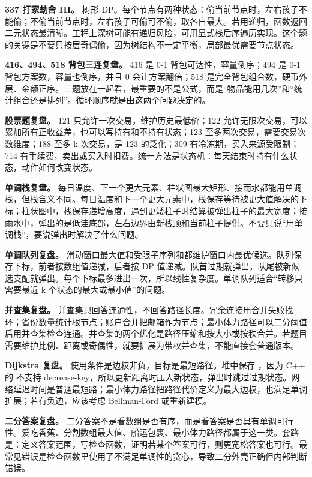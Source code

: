 \textbf{337 打家劫舍 III。} 树形 DP。每个节点有两种状态：偷当前节点时，左右孩子不能偷；不偷当前节点时，左右孩子可偷可不偷，取各自最大。若用递归，函数返回二元状态最清晰。工程上深树可能有递归风险，可用显式栈后序遍历实现。这个题的关键是不要只按层奇偶偷，因为树结构不一定平衡，局部最优需要节点状态。

\textbf{416、494、518 背包三连复盘。} 416 是 0-1 背包可达性，容量倒序；494 是 0-1 背包方案数，容量也倒序，并且 0 会让方案翻倍；518 是完全背包组合数，硬币外层、金额正序。三题放在一起看，最重要的不是公式，而是“物品能用几次”和“统计组合还是排列”。循环顺序就是由这两个问题决定的。

\textbf{股票题复盘。} 121 只允许一次交易，维护历史最低价；122 允许无限次交易，可以累加所有正收益差，也可以写持有和不持有状态；123 至多两次交易，需要交易次数维度；188 至多 k 次交易，是 123 的泛化；309 有冷冻期，买入来源受限制；714 有手续费，卖出或买入时扣费。统一方法是状态机：每天结束时持有什么状态，动作如何改变状态。

\textbf{单调栈复盘。} 每日温度、下一个更大元素、柱状图最大矩形、接雨水都能用单调栈，但栈含义不同。每日温度和下一个更大元素中，栈保存等待被更大值解决的下标；柱状图中，栈保存递增高度，遇到更矮柱子时结算被弹出柱子的最大宽度；接雨水中，弹出的是低洼底部，左右边界由新栈顶和当前柱子提供。不要只说“用单调栈”，要说弹出时解决了什么问题。

\textbf{单调队列复盘。} 滑动窗口最大值和受限子序列和都维护窗口内最优候选。队列保存下标，前者按数组值递减，后者按 DP 值递减。队首过期就弹出，队尾被新候选支配就弹出。每个下标最多进出一次，所以线性复杂度。单调队列适合“转移只需要最近 k 个状态的最大或最小值”的问题。

\textbf{并查集复盘。} 并查集只回答连通性，不回答路径长度。冗余连接用合并失败找环；省份数量统计根节点；账户合并把邮箱作为节点；最小体力路径可以二分阈值后用并查集检查连通。并查集的两个优化是路径压缩和按大小或按秩合并。若题目需要维护比例、距离或奇偶性，就要扩展为带权并查集，不能直接套普通版本。

\textbf{Dijkstra 复盘。} 使用条件是边权非负，目标是最短路径。堆中保存 ，因为 C++ 的  不支持 decrease-key，所以更新距离时压入新状态，弹出时跳过过期状态。网络延迟时间是普通最短路；最小体力路径把路径代价定义为最大边权，也满足单调扩展；若有负边，应该考虑 Bellman-Ford 或重新建模。

\textbf{二分答案复盘。} 二分答案不是看数组是否有序，而是看答案是否具有单调可行性。爱吃香蕉、分割数组最大值、船运包裹、最小体力路径都属于这一类。套路是：定义答案范围，写检查函数，证明若某个答案可行，则更宽松答案也可行。最常见错误是检查函数里使用了不满足单调性的贪心，导致二分外壳正确但内部判断错误。

